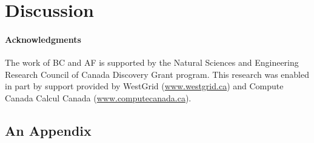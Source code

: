 \documentclass[../PhD.tex]{subfiles}
\begin{document}
\section{Discussion}



\paragraph*{Acknowledgments} The work of BC and AF is supported by the Natural Sciences
and Engineering Research Council of Canada Discovery Grant program.
This research was enabled in part by support provided by WestGrid
(\href{www.westgrid.ca}{www.westgrid.ca}) and Compute Canada Calcul Canada (\href{www.computecanada.ca}{www.computecanada.ca}).


\begin{subappendices}

\section{An Appendix}

\end{subappendices}

%
%
\end{document}
